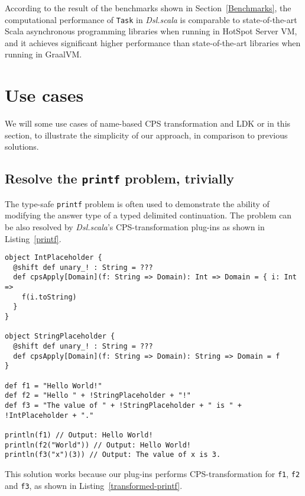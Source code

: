\begin{description}
  According to the result of the benchmarks shown in Section~\ref{Benchmarks}, the computational performance of \lstinline{Task} in \textit{Dsl.scala} is comparable to state-of-the-art Scala asynchronous programming libraries when running in HotSpot Server VM, and it achieves significant higher performance than state-of-the-art libraries when running in GraalVM.
\end{description}

\section{Use cases}

We will some use cases of name-based CPS transformation and LDK or  in this section, to illustrate the simplicity of our approach, in comparison to previous solutions.

\subsection{Resolve the \lstinline{printf} problem, trivially}\label{resolve-printf-problem}

The type-safe \lstinline{printf} problem \cite{danvy1998functional} is often used to demonstrate the ability of modifying the answer type of a typed delimited continuation. The problem can be also resolved by \textit{Dsl.scala}'s CPS-transformation plug-ins as shown in Listing~\ref{printf}.

\begin{lstlisting}[caption={A solution of the type-safe \lstinline{printf} problem in \textit{Dsl.scala}},label={printf}]
object IntPlaceholder {
  @shift def unary_! : String = ???
  def cpsApply[Domain](f: String => Domain): Int => Domain = { i: Int =>
    f(i.toString)
  }
}

object StringPlaceholder {
  @shift def unary_! : String = ???
  def cpsApply[Domain](f: String => Domain): String => Domain = f
}

def f1 = "Hello World!"
def f2 = "Hello " + !StringPlaceholder + "!"
def f3 = "The value of " + !StringPlaceholder + " is " + !IntPlaceholder + "."

println(f1) // Output: Hello World!
println(f2("World")) // Output: Hello World!
println(f3("x")(3)) // Output: The value of x is 3.
\end{lstlisting}

This solution works because our plug-ins performs CPS-transformation for \lstinline{f1}, \lstinline{f2} and \lstinline{f3}, as shown in Listing~\ref{transformed-printf}.

